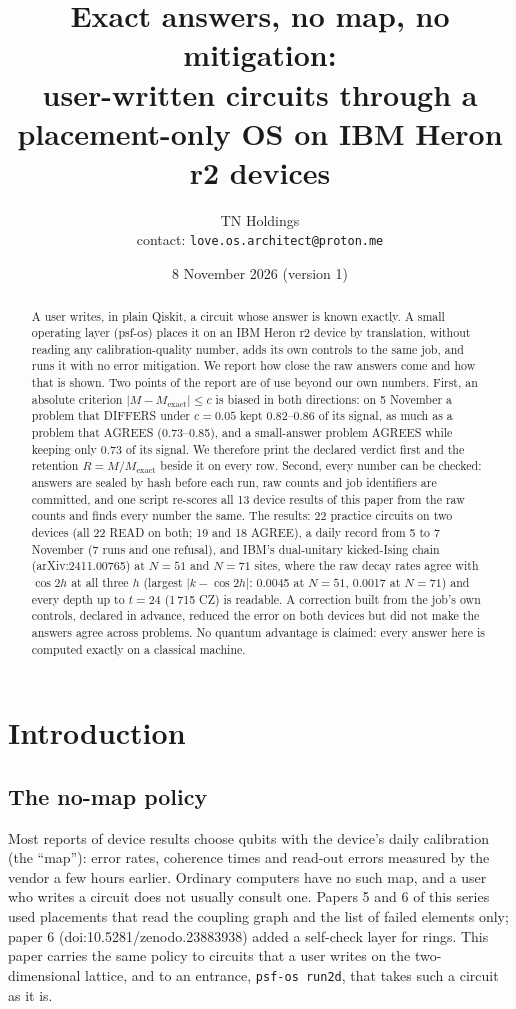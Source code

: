 \documentclass[10pt,a4paper]{article}
\title{Exact answers, no map, no mitigation:\\ user-written circuits through a placement-only OS on IBM Heron r2
devices}
\author{TN Holdings\\ \small contact: \texttt{love.os.architect@proton.me}}
\date{8 November 2026 (version 1)}
\begin{document}
\maketitle

\begin{abstract}
A user writes, in plain Qiskit, a circuit whose answer is known exactly. A small operating layer (psf-os) places it
on an IBM Heron r2 device by translation, without reading any calibration-quality number, adds its own controls to
the same job, and runs it with no error mitigation. We report how close the raw answers come and how that is shown.
Two points of the report are of use beyond our own numbers. First, an absolute criterion
$|M - M_\mathrm{exact}| \le c$ is biased in both directions: on 5 November a problem that DIFFERS under
$c = 0.05$ kept 0.82--0.86 of its signal, as much as a problem that AGREES (0.73--0.85), and a small-answer problem
AGREES while keeping only 0.73 of its signal. We therefore print the declared verdict first and the retention
$R = M/M_\mathrm{exact}$ beside it on every row. Second, every number can be checked: answers are sealed by hash
before each run, raw counts and job identifiers are committed, and one script re-scores all 13 device results of
this paper from the raw counts and finds every number the same. The results: 22 practice circuits on two devices
(all 22 READ on both; 19 and 18 AGREE), a daily record from 5 to 7 November (7 runs and one refusal), and IBM's
dual-unitary kicked-Ising chain (arXiv:2411.00765) at $N = 51$ and $N = 71$ sites, where the raw decay rates agree
with $\cos 2h$ at all three $h$ (largest $|k - \cos 2h|$: 0.0045 at $N = 51$, 0.0017 at $N = 71$) and every depth
up to $t = 24$ (1\,715 CZ) is readable. A correction built from the job's own controls, declared in advance, reduced
the error on both devices but did not make the answers agree across problems. No quantum advantage is claimed: every
answer here is computed exactly on a classical machine.
\end{abstract}

\section{Introduction}

\subsection{The no-map policy}
Most reports of device results choose qubits with the device's daily calibration (the ``map''): error rates,
coherence times and read-out errors measured by the vendor a few hours earlier. Ordinary computers have no such map,
and a user who writes a circuit does not usually consult one. Papers 5 and 6 of this series used placements that read
the coupling graph and the list of failed elements only; paper 6 (doi:10.5281/zenodo.23883938) added a self-check
layer for rings. This paper carries the same policy to circuits that a user writes on the two-dimensional lattice,
and to an entrance, \texttt{psf-os run2d}, that takes such a circuit as it is.
\end{document}

